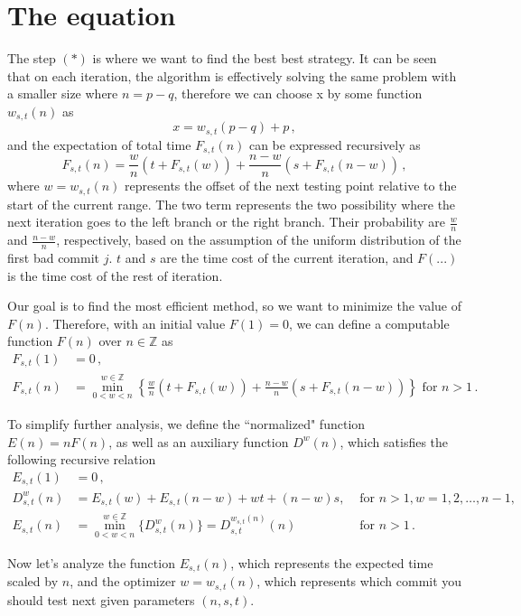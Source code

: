\documentclass[]{article}
\begin{document}
\section{The equation}
 
The step $(*)$ is where we want to find the best best strategy. It can be seen that on each iteration, the algorithm is effectively solving the same problem with a smaller size where $n = p - q$, therefore we can choose x by some function $w_{s,t}(n)$ as
\[
x = w_{s,t}(p - q) + p \,,
\]
and the expectation of total time $F_{s,t}(n)$ can be expressed recursively as
\begin{equation}
F_{s,t}(n) = \frac{w}{n}(t + F_{s,t}(w)) + \frac{n-w}{n}(s + F_{s,t}(n-w))\,,
\end{equation}
where $w = w_{s,t}(n)$ represents the offset of the next testing point relative to the start of the current range. The two term represents the two possibility where the next iteration goes to the left branch or the right branch. Their probability are $\frac{w}{n}$ and $\frac{n-w}{n}$, respectively, based on the assumption of the uniform distribution of the first bad commit $j$. $t$ and $s$ are the time cost of the current iteration, and $F(...)$ is the time cost of the rest of iteration.

Our goal is to find the most efficient method, so we want to minimize the value of $F(n)$. Therefore, with an initial value $F(1) = 0$, we can define a computable function $F(n)$ over $n \in \mathbb{Z}$ as
\begin{align*}
F_{s,t}(1) &= 0\,,\\
F_{s,t}(n) &= \min_{0<w<n}^{w\in\mathbb{Z}}\left\{\frac{w}{n}(t + F_{s,t}(w)) + \frac{n-w}{n}(s + F_{s,t}(n-w))\right\} \textrm{ for } n > 1 \,.
\end{align*}

To simplify further analysis, we define the ``normalized" function $E(n) = nF(n)$, as well as an auxiliary function $D^w(n)$, which satisfies the following recursive relation
\begin{align*}
E_{s,t}(1) &= 0\,,\\
D^{w}_{s,t}(n) &= E_{s,t}(w) + E_{s,t}(n-w) + wt +(n-w)s,&\textrm{ for } n > 1, w=1,2,\dots,n-1, \\
E_{s,t}(n) &= \min_{0<w<n}^{w\in\mathbb{Z}}\{D^{w}_{s,t}(n)\} = D^{w_{s,t}(n)}_{s,t}(n) &\textrm{ for } n > 1 \,.
\end{align*}

Now let's analyze the function $E_{s,t}(n)$, which represents the expected time scaled by $n$, and the optimizer $w = w_{s,t}(n)$, which represents which commit you should test next given parameters $(n,s,t)$.
\end{document}
